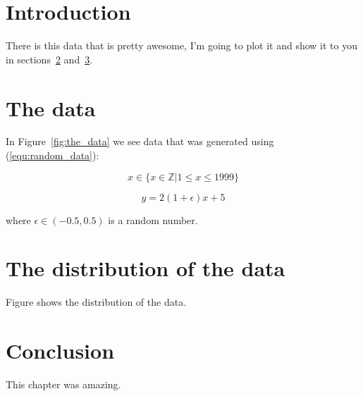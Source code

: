 \section{Introduction}

There is this data that is pretty awesome, I'm going to plot it and show it to
you in sections~\ref{sec:the_data} and~\ref{sec:the_distribution_of_the_data}.

\section{The data}\label{sec:the_data}

In Figure~\ref{fig:the_data} we see data that was generated using
(\ref{equ:random_data}):

\begin{equation}
    x \in \{x \in \mathbb{Z}| 1 \leq x \leq 1999\}
\end{equation}

\begin{equation}
    y = 2(1 + \epsilon) x + 5
\end{equation}

where \(\epsilon\in(-0.5, 0.5)\) is a random number.

\begin{figure}[!hbtp]
\end{figure}

\section{The distribution of the data}\label{sec:the_distribution_of_the_data}

Figure shows the distribution of the data.

\begin{figure}[!hbtp]
\end{figure}

\section{Conclusion}\label{sec:conclusion}

This chapter was amazing.
